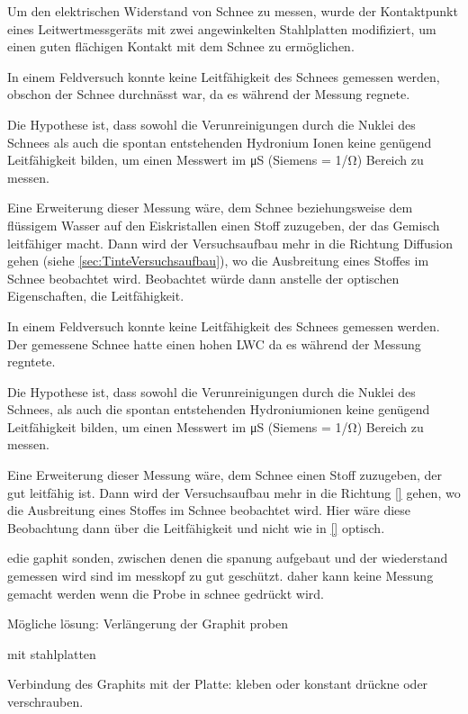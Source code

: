 Um den elektrischen Widerstand von Schnee zu messen, wurde der Kontaktpunkt eines Leitwertmessgeräts mit zwei angewinkelten Stahlplatten modifiziert, um einen guten flächigen Kontakt mit dem Schnee zu ermöglichen.

In einem Feldversuch konnte keine Leitfähigkeit des Schnees gemessen werden, obschon der Schnee durchnässt war, da es während der Messung regnete.


Die Hypothese ist, dass sowohl die Verunreinigungen durch die Nuklei des Schnees als auch die spontan entstehenden Hydronium Ionen keine genügend Leitfähigkeit bilden,  um einen Messwert im \si{\micro\siemens} (Siemens = \si{1/\ohm}) Bereich zu messen. \cite{Scholz.2020}


Eine Erweiterung dieser Messung wäre, dem Schnee beziehungsweise dem flüssigem Wasser auf den Eiskristallen einen Stoff zuzugeben, der das Gemisch leitfähiger macht. Dann wird der Versuchsaufbau mehr in die Richtung Diffusion gehen (siehe \ref{sec:TinteVersuchsaufbau}), wo die Ausbreitung eines Stoffes im Schnee beobachtet wird. Beobachtet würde dann anstelle der optischen Eigenschaften, die Leitfähigkeit.




\iffalse
In einem Feldversuch konnte keine Leitfähigkeit des Schnees gemessen werden. Der gemessene Schnee hatte einen hohen LWC da es während der Messung regntete.


Die Hypothese ist, dass sowohl die Verunreinigungen durch die Nuklei des Schnees, als auch die spontan entstehenden Hydroniumionen  keine genügend Leitfähigkeit bilden,  um einen Messwert im \si{\micro\siemens} (Siemens = \si{1/\ohm}) Bereich zu messen.

Eine Erweiterung dieser Messung wäre, dem Schnee einen Stoff zuzugeben, der gut leitfähig ist. Dann wird der Versuchsaufbau mehr in die Richtung \ref{} gehen, wo die Ausbreitung eines Stoffes im Schnee beobachtet wird. Hier wäre diese Beobachtung dann über die Leitfähigkeit und nicht wie in \ref{} optisch.




edie gaphit sonden, zwischen denen die spanung aufgebaut und der wiederstand gemessen wird sind im messkopf zu gut geschützt. daher kann keine Messung gemacht werden wenn die Probe in schnee gedrückt wird.

Mögliche lösung: Verlängerung der Graphit proben

mit stahlplatten

Verbindung des Graphits mit der Platte: kleben oder konstant drückne oder verschrauben.

